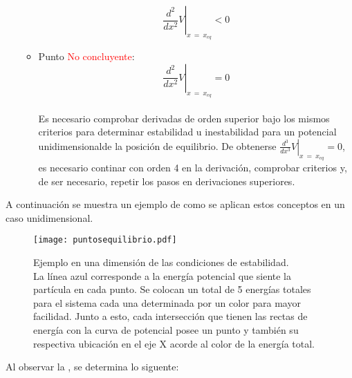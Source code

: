 \documentclass[/home/hernan-barquero/Documents/Apuntes_mecanica_teorica/main.tex]{subfiles}
\begin{document}
\begin{definition}
\begin{itemize}
\begin{itemize}
				\begin{equation}
					\left .  \frac{d^2}{dx^2}V \right|_{x \: = \: x_{eq}} < 0
					\label{eq: puntoinestable}
				\end{equation}
				\item Punto \textcolor{red}{No concluyente}:  				
				\begin{equation}
					\left .  \frac{d^2}{dx^2}V \right|_{x \: = \: x_{eq}} = 0
					\label{eq: puntonoconcluyente}
				\end{equation}
				\\Es necesario comprobar derivadas de orden superior bajo los mismos criterios para determinar estabilidad u inestabilidad para un potencial unidimensionalde la posición de equilibrio. De obtenerse  $\left .  \frac{d^3}{dx^3}V \right|_{x \: = \: x_{eq}}  = 0$, es necesario continar con orden 4 en la derivación, comprobar criterios y, de ser necesario, repetir los pasos en derivaciones superiores.
			\end{itemize}
		\end{itemize}
	\end{definition}

	A continuación se muestra un ejemplo de como se aplican estos conceptos en un caso unidimensional.
	\begin{figure}[H]
		\centering
		\texttt{[image: puntosequilibrio.pdf]}
		\caption{Ejemplo en una dimensión de las condiciones de estabilidad. \\ La línea azul corresponde a la energía potencial que siente la partícula en cada punto. Se colocan un total de 5 energías totales para el sistema cada una determinada por un color para mayor facilidad. Junto a esto, cada intersección que tienen las rectas de energía con la curva de potencial posee un punto y también su respectiva ubicación en el eje X acorde al color de la energía total.}
		\label{fig: puntosequilibrio}
	\end{figure}

	Al observar la , se determina lo siguente:
\end{document}
